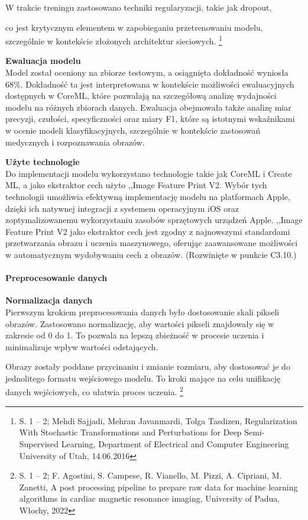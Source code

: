 \documentclass[12pt, a4paper, twoside, openany]{book}
\newcommand{\forceindent}{\leavevmode{\parindent=1.3em\indent}}
\begin{document}
W trakcie treningu zastosowano techniki regularyzacji, takie jak dropout, {co jest krytycznym elementem w zapobieganiu przetrenowaniu modelu, szczególnie w kontekście złożonych architektur sieciowych. \footnote{
    S. 1 -- 2; Mehdi Sajjadi, Mehran Javanmardi, Tolga Tasdizen, Regularization With Stochastic Transformations and Perturbations for Deep Semi-Supervised Learning, Department of Electrical and Computer Engineering University of Utah, 14.06.2016
}

\textbf{Ewaluacja modelu\\}
\forceindent Model został oceniony na zbiorze testowym, a osiągnięta dokładność wyniosła 68\%.
Dokładność ta jest interpretowana w kontekście możliwości ewaluacyjnych dostępnych w CoreML, które pozwalają na szczegółową analizę wydajności modelu na różnych zbiorach danych.
Ewaluacja obejmowała także analizę miar precyzji, czułości, specyficzności oraz miary F1, które są istotnymi wskaźnikami w ocenie modeli klasyfikacyjnych, szczególnie w kontekście zastosowań medycznych i rozpoznawania obrazów.

\textbf{Użyte technologie\\}
\forceindent Do implementacji modelu wykorzystano technologie takie jak CoreML i Create ML, a jako ekstraktor cech użyto ,,Image Feature Print V2. Wybór tych technologii umożliwia efektywną implementację modelu na platformach Apple, dzięki ich natywnej integracji z systemem operacyjnym iOS oraz zoptymalizowanemu wykorzystaniu zasobów sprzętowych urządzeń Apple. ,,Image Feature Print V2 jako ekstraktor cech jest zgodny z najnowszymi standardami przetwarzania obrazu i uczenia maszynowego, oferując zaawansowane możliwości w automatycznym wydobywaniu cech z obrazów. (Rozwinięte w punkcie C3.10.)

\paragraph{Preprocesowanie danych\\}
\forceindent \textbf{ Normalizacja danych\\}
\indent Pierwszym krokiem preprocesowania danych było dostosowanie skali pikseli obrazów.
Zastosowano normalizację, aby wartości pikseli znajdowały się w zakresie od 0 do 1.
To pozwala na lepszą zbieżność w procesie uczenia i minimalizuje wpływ wartości odstających.

Obrazy zostały poddane przycinaniu i zmianie rozmiaru, aby dostosować je do jednolitego formatu wejściowego modelu.
To kroki mające na celu unifikację danych wejściowych, co ułatwia proces uczenia. \footnote{
    S. 1 -- 2; F. Agostini, S. Campese, R. Vianello, M. Pizzi, A. Cipriani, M. Zanetti, A post processing pipeline to prepare raw data for machine learning algorithms in cardiac magnetic resonance imaging, University of Padua, Włochy, 2022
}

}
\end{document}
